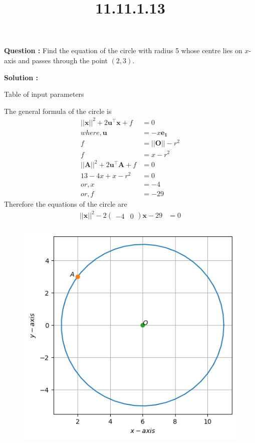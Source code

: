 \documentclass[12pt]{article}
\let\vec\mathbf
\providecommand{\brak}[1]{\ensuremath{\left(#1\right)}}
\providecommand{\myvec}[1]{\ensuremath{\begin{pmatrix}#1\end{pmatrix}}}
\providecommand{\norm}[1]{\ensuremath{\lvert|#1\rvert|}}
\begin{document}
\title{\textbf{11.11.1.13}}
\date{}
\maketitle
\textbf{Question :} Find the equation of the circle with radius 5 whose centre lies on $x$-axis and passes through the point $\brak{2,3}$.

\textbf{Solution :}
\begin{table}[H]
    \centering
    
        \caption{Table of input parameters}
    \label{tab:11.11.1.13}
\end{table}
The general formula of the circle is
\begin{align}
\norm{\vec{x}}^2 + 2\vec{u}^{\top}\vec{x}+f&=0\\
	where,   \vec{u}&=-x\vec{e_1}\\
	f&=\norm{\vec{O}}-r^2\\
f&=x-r^2\\
\norm{\vec{A}}^2 + 2\vec{u}^{\top}\vec{A}+f&=0\\
13-4x+x-r^2&=0\\
or,x&=-4\\
or,f&=-29
\end{align}
Therefore the equations of the circle are
\begin{align}
   \norm{\vec{x}}^2 - 2\myvec{-4&0}\vec{x}-29&=0\\
\end{align}    
\begin{figure}[H]
    \centering
\includegraphics[width=\columnwidth]{fig/11.11.1.13.png}
    \caption{}
    \label{fig:11.11.1.13}
\end{figure}
\end{document}
